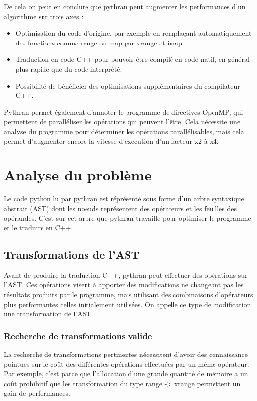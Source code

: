 \documentclass[a4paper]{article}
\begin{document}
De cela on peut en conclure que pythran peut augmenter les performances d'un algorithme sur trois axes :

\begin{itemize}
  \item Optimisation du code d'origine, par exemple en remplaçant automatiquement des fonctions comme range ou map par xrange et imap.
  \item Traduction en code C++ pour pouvoir être compilé en code natif, en général plus rapide que du code interprété.
  \item Possibilité de bénéficier des optimisations supplémentaires du compilateur C++.
\end{itemize}


Pythran permet également d'annoter le programme de directives OpenMP, qui permettent de paralléliser les opérations qui peuvent l'être. Cela nécessite une analyse du programme pour déterminer les opérations parallélisables, mais cela permet d'augmenter encore la vitesse d'execution d'un facteur x2 à x4\cite{PythranRenpar}.

\section{Analyse du problème}

Le code python lu par pythran est réprésenté sous forme d'un arbre syntaxique abstrait (AST) dont les noeuds représentent des opérateurs et les feuilles des opérandes. C'est sur cet arbre que pythran travaille pour optimiser le programme et le traduire en C++.

\subsection{Transformations de l'AST}

Avant de produire la traduction C++, pythran peut effectuer des opérations sur l'AST. Ces opérations visent à apporter des modifications ne changeant pas les résultats produits par le programme, mais utilisant des combinaisons d'opérateurs plus performantes celles initialement utilisées. On appelle ce type de modification une transformation de l'AST.

\subsubsection{Recherche de transformations valide}

La recherche de transformations pertinentes nécessitent d'avoir des connaissance pointues sur le coût des différentes opérations effectuées par un même opérateur. Par exemple, c'est parce que l'allocation d'une grande quantité de mémoire a un coût prohibitif que les transformation du type range -> xrange permettent un gain de performances.
\end{document}
